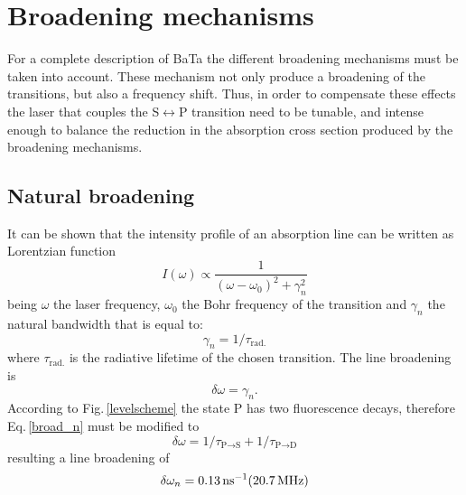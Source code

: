 \section{Broadening mechanisms}
For a complete description of BaTa the different broadening mechanisms must be taken into account. These mechanism not only produce a broadening of the transitions, but also a frequency shift. Thus, in order to compensate these effects the laser that couples the S$\leftrightarrow$P transition need to be tunable, and intense enough to balance the reduction in the absorption cross section produced by the broadening mechanisms.

\subsection{Natural broadening} 
It can be shown that the intensity profile of an absorption line can be written as Lorentzian function \cite{Demtroder03}
\begin{equation}
\label{Lorentz}
I(\omega)\propto\frac{1}{(\omega-\omega_0)^2+\gamma_n^2}
\end{equation}
being $\omega$ the laser frequency, $\omega_0$ the Bohr frequency of the transition and $\gamma_n$ the natural bandwidth that is equal to:
\begin{equation}
\label{gamma_n}
\gamma_n=1/\tau_{\text{rad.}}
\end{equation}
where $\tau_{\text{rad.}}$ is the radiative lifetime of the chosen transition. The line broadening is 
\begin{equation}
\label{broad_n}
\delta\omega=\gamma_n.
\end{equation}
According to Fig.\,\ref{levelscheme} the state P has two fluorescence decays, therefore Eq.\,\ref{broad_n} must be modified to
\begin{equation}
\delta\omega=1/\tau_{\text{P}\rightarrow\text{S}}+1/\tau_{\text{P}\rightarrow\text{D}}
\end{equation}
resulting a line broadening of
\begin{equation}
\delta\omega_n=0.13\,\text{ns$^{-1}$} (20.7\,\text{MHz})
\end{equation}

